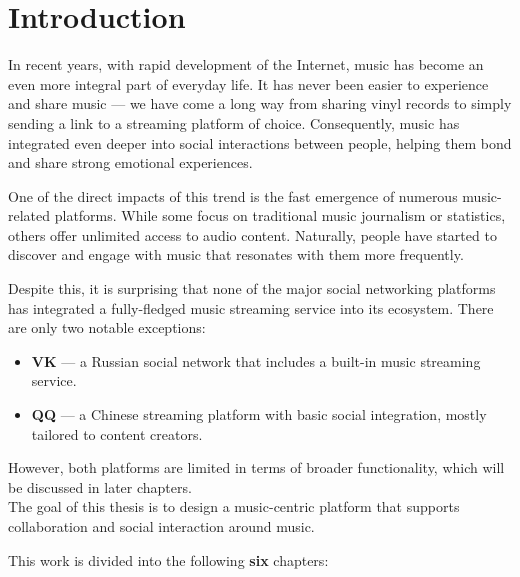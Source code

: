 \chapter{Introduction}

In recent years, with rapid development of the Internet,
music has become an even more integral part of everyday life.\cite{music_role_life}
It has never been easier to experience and share music — we have come
a long way from sharing vinyl records to simply sending a link to a streaming platform of choice.
Consequently, music has integrated even deeper into social interactions between people,
helping them bond and share strong emotional experiences.\cite{music_role_life}

One of the direct impacts of this trend is the fast emergence of numerous music-related platforms.
While some focus on traditional music journalism or statistics, others offer unlimited access to audio content.
Naturally, people have started to discover and engage with music that resonates with them more frequently.

Despite this, it is surprising that none of the major social networking platforms has integrated
a fully-fledged music streaming service into its ecosystem.
There are only two notable exceptions:

\begin{itemize}
    \item \textbf{VK} — a Russian social network that includes a built-in music streaming service.
    \item \textbf{QQ} — a Chinese streaming platform with basic social integration, mostly tailored to content creators.
\end{itemize}

However, both platforms are limited in terms of broader functionality, which will be discussed in later chapters.\\

The goal of this thesis is to design a music-centric platform that supports
collaboration and social interaction around music.

This work is divided into the following \textbf{six} chapters:

